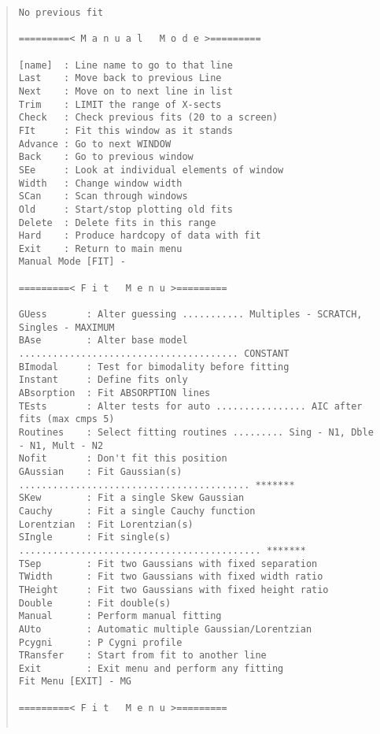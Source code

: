 \begin{quote}\begin{verbatim}
No previous fit

=========< M a n u a l   M o d e >=========

[name]  : Line name to go to that line
Last    : Move back to previous Line
Next    : Move on to next line in list
Trim    : LIMIT the range of X-sects
Check   : Check previous fits (20 to a screen)
FIt     : Fit this window as it stands
Advance : Go to next WINDOW
Back    : Go to previous window
SEe     : Look at individual elements of window
Width   : Change window width
SCan    : Scan through windows
Old     : Start/stop plotting old fits
Delete  : Delete fits in this range
Hard    : Produce hardcopy of data with fit
Exit    : Return to main menu
Manual Mode [FIT] -

=========< F i t   M e n u >=========

GUess       : Alter guessing ........... Multiples - SCRATCH, Singles - MAXIMUM
BAse        : Alter base model ....................................... CONSTANT
BImodal     : Test for bimodality before fitting
Instant     : Define fits only
ABsorption  : Fit ABSORPTION lines
TEsts       : Alter tests for auto ................ AIC after fits (max cmps 5)
Routines    : Select fitting routines ......... Sing - N1, Dble - N1, Mult - N2
Nofit       : Don't fit this position
GAussian    : Fit Gaussian(s) ......................................... *******
SKew        : Fit a single Skew Gaussian
Cauchy      : Fit a single Cauchy function
Lorentzian  : Fit Lorentzian(s)
SIngle      : Fit single(s) ........................................... *******
TSep        : Fit two Gaussians with fixed separation
TWidth      : Fit two Gaussians with fixed width ratio
THeight     : Fit two Gaussians with fixed height ratio
Double      : Fit double(s)
Manual      : Perform manual fitting
AUto        : Automatic multiple Gaussian/Lorentzian
Pcygni      : P Cygni profile
TRansfer    : Start from fit to another line
Exit        : Exit menu and perform any fitting
Fit Menu [EXIT] - MG

=========< F i t   M e n u >=========


\end{verbatim}
\end{quote}

